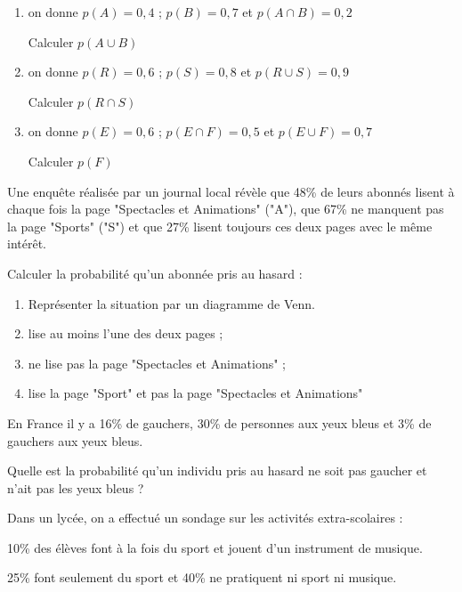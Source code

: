 
\exo 

\begin{enumerate}
\item on donne $p(A) = 0,4$  \qquad ; \qquad $p(B)=0,7$ \qquad et \qquad $p(A\cap B)=0,2$

Calculer $p(A \cup B)$
\item on donne $p(R) = 0,6$  \qquad ; \qquad $p(S)=0,8$ \qquad et \qquad $p(R\cup S)=0,9$

Calculer $p(R \cap S)$
\item on donne $p(E) = 0,6$  \qquad ; \qquad $p(E \cap F)=0,5$ \qquad et \qquad $p(E\cup F)=0,7$

Calculer $p(F)$


\end{enumerate}

\medskip

\exo

Une enquête réalisée par un journal local révèle que 48\% de leurs abonnés lisent à chaque fois la page "Spectacles et Animations" ("A"), que 67\% ne manquent pas la page "Sports" ("S") et que 27\% lisent toujours ces deux pages avec le même intérêt.

Calculer la probabilité qu'un abonnée pris au hasard :
\begin{enumerate}%
\item Représenter la situation par un diagramme de Venn.
\item lise au moins l'une des deux pages ;
\item ne lise pas la page "Spectacles et Animations" ;
\item lise la page "Sport" et pas la page "Spectacles et Animations"
\end{enumerate}

\medskip


\exo 

En France il y a 16\% de gauchers, 30\% de personnes aux yeux bleus et 3\% de gauchers aux yeux bleus.

Quelle est la probabilité qu'un individu pris au hasard ne soit pas gaucher et n'ait pas les yeux bleus ?

\medskip

\exo

Dans un lycée, on a effectué un sondage sur les activités extra-scolaires :

10\% des élèves font à la fois du sport et jouent d'un instrument de musique. 

25\% font seulement du sport et 40\% ne pratiquent ni sport ni musique.

